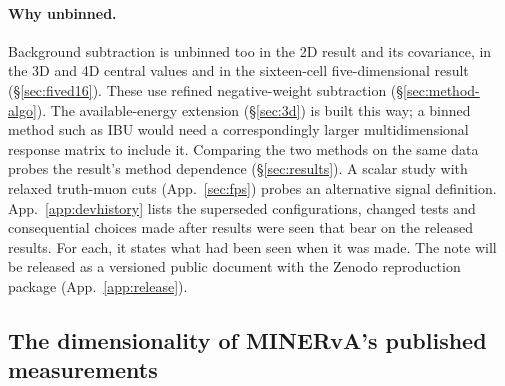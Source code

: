 \paragraph{Why unbinned.} Background subtraction is unbinned too in the 2D result and its covariance, in the 3D and 4D central values and in the sixteen-cell five-dimensional result (\S\ref{sec:fived16}). These use refined negative-weight subtraction (\S\ref{sec:method-algo}). The available-energy extension (\S\ref{sec:3d}) is built this way; a binned method such as IBU would need a correspondingly larger multidimensional response matrix to include it. Comparing the two methods on the same data probes the result's method dependence (\S\ref{sec:results}). A scalar study with relaxed truth-muon cuts (App.~\ref{sec:fps}) probes an alternative signal definition. App.~\ref{app:devhistory} lists the superseded configurations, changed tests and consequential choices made after results were seen that bear on the released results. For each, it states what had been seen when it was made. The note will be released as a versioned public document with the Zenodo reproduction package (App.~\ref{app:release}).

\subsection{The dimensionality of MINERvA's published measurements}\label{recsec:intro-survey}

